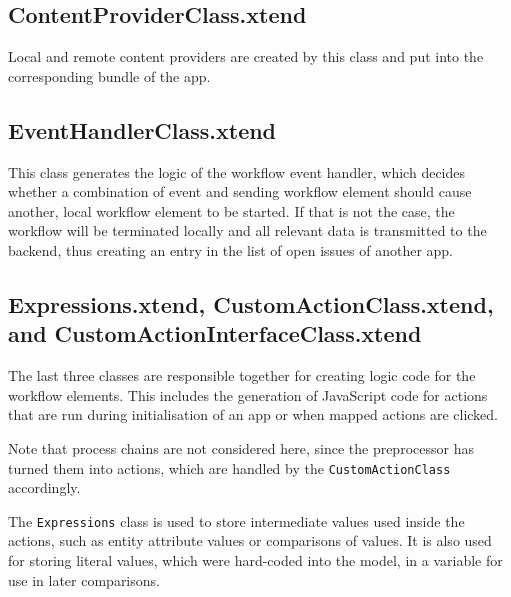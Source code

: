 \subsection{ContentProviderClass.xtend}
Local and remote content providers are created by this class and put into the corresponding bundle of the app.

\subsection{EventHandlerClass.xtend}
This class generates the logic of the workflow event handler, which decides whether a combination of event and sending workflow element should cause another, local workflow element to be started. If that is not the case, the workflow will be terminated locally and all relevant data is transmitted to the backend, thus creating an entry in the list of open issues of another app.

\subsection{Expressions.xtend, CustomActionClass.xtend, and CustomActionInterfaceClass.xtend}

The last three classes are responsible together for creating logic code for the workflow elements. This includes the generation of JavaScript code for actions that are run during initialisation of an app or when mapped actions are clicked. 

Note that process chains are not considered here, since the preprocessor has turned them into actions, which are handled by the \lstinline|CustomActionClass| accordingly.

The \lstinline|Expressions| class is used to store intermediate values used inside the actions, such as entity attribute values or comparisons of values. It is also used for storing literal values, which were hard-coded into the model, in a variable for use in later comparisons.